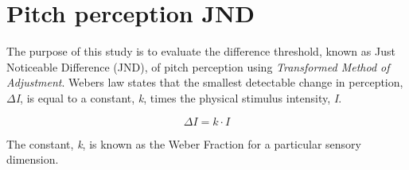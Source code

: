 \chapter*{Pitch perception JND}
The purpose of this study is to evaluate the difference threshold, known as Just Noticeable Difference (JND), of pitch perception using \textit{Transformed Method of Adjustment}. Webers law states that the smallest detectable change in perception, $\Delta$\textit{I}, is equal to a constant, \textit{k}, times the physical stimulus intensity, \textit{I}.

\begin{equation}
\Delta I= k \cdot I
\end{equation}

The constant, \textit{k}, is known as the Weber Fraction for a particular sensory dimension.